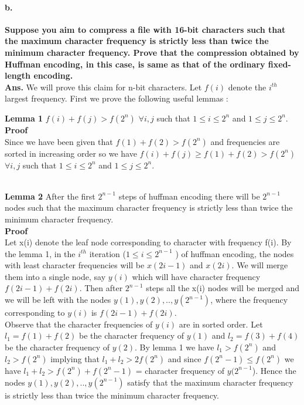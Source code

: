 \documentclass[a4paper]{article}
\begin{document}
 \paragraph{b.}\textbf{Suppose you aim to compress a file with 16-bit characters such that the maximum character frequency is strictly less than twice the minimum character frequency. Prove that the compression obtained by Huffman encoding, in this case, is same as that of the ordinary fixed-length encoding.} \\ 
\textbf{Ans.} {We will prove this claim for n-bit characters. Let  $f(i)$ denote the $i^{th}$ largest frequency. First we prove the following useful lemmas : } \\
\begin{lemma}
\textbf{Lemma 1} $f(i)+f(j)> f(2^n) $  $ \forall  i  ,  j $ such that $1 \leq i \leq 2^n$ and $1 \leq  j \leq  2^n$. \\ 
\textbf{Proof} \\ {Since we have been given that $f(1)+f(2)>f(2^n)$ and frequencies are sorted in increasing order so we have $ f(i) + f(j) \geq f(1) + f(2) > f(2^n) $  $\forall i,j$ such that $1 \leq i \leq 2^n$ and $1 \leq  j \leq  2^n$.}
\end{lemma} \\
\textbf{Lemma 2} After the first $2^{n-1}$ steps of huffman encoding there will be $2^{n-1}$ nodes such that the  maximum  character frequency is strictly less than twice the minimum character frequency. \\
\textbf{Proof} \\{Let x(i) denote the leaf node corresponding to character with frequency f(i). By the lemma 1, in the $i^{th}$ iteration ($ 1 \leq i \leq 2^{n-1}$ ) of huffman encoding, the nodes with least character frequencies will be $x(2i-1)$ and $x(2i)$. We will merge them into a single node, say $y(i)$ which will have character frequency $f(2i-1) + f(2i)$. Then after $2^{n-1}$ steps all the x(i) nodes will be merged and we will be left with the nodes $y(1),y(2),..,y(2^{n-1})$, where the frequency corresponding to $y(i)$ is $f(2i-1) + f(2i)$.\\
Observe that the character frequencies of $y(i)$ are in sorted order. Let $l_{1} = f(1)+f(2)$ be the character frequency of $y(1)$ and $l_{2} = f(3)+f(4)$ be the character frequency of $y(2)$. By lemma 1 we have $ l_{1} > f(2^n) $ and $ l_{2} > f(2^n) $ implying that $l_{1} + l_{2} > 2f(2^n)$ and since $f(2^n-1) \leq f(2^n) $ we have $ l_{1} + l_{2} > f(2^n) + f(2^n-1) $ = character frequency of $y(2^{n-1}$). Hence the nodes  $y(1),y(2),..,y(2^{n-1})$ satisfy that the maximum character frequency is strictly less than twice the minimum character frequency. }
\end{document}
